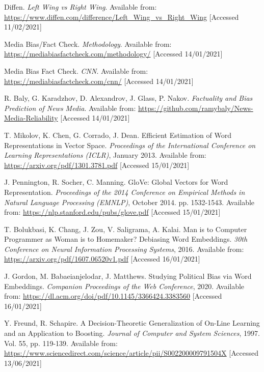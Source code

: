 \begin{thebibliography}{9}
Diffen. \textit{Left Wing vs Right Wing}. Available from: \url{https://www.diffen.com/difference/Left_Wing_vs_Right_Wing} [Accessed 11/02/2021]

Media Bias/Fact Check. \textit{Methodology}. Available from: \url{https://mediabiasfactcheck.com/methodology/} [Accessed 14/01/2021]

Media Bias Fact Check. \textit{CNN}. Available from: \url{https://mediabiasfactcheck.com/cnn/} [Accessed 14/01/2021]

R. Baly, G. Karadzhov, D. Alexandrov, J. Glass, P. Nakov. \textit{Factuality and Bias Prediction of News Media}. Available from: \url{https://github.com/ramybaly/News-Media-Reliability} [Accessed 14/01/2021]

T. Mikolov, K. Chen, G. Corrado, J. Dean. Efficient Estimation of Word Representations in Vector Space. \textit{Proceedings of the International Conference on Learning Representations (ICLR)}, January 2013. Available from: \url{https://arxiv.org/pdf/1301.3781.pdf} [Accessed 15/01/2021]

J. Pennington, R. Socher, C. Manning. GloVe: Global Vectors for Word Representation. \textit{Proceedings of the 2014 Conference on Empirical Methods in Natural Language Processing (EMNLP)}, October 2014. pp. 1532-1543. Available from: \url{https://nlp.stanford.edu/pubs/glove.pdf} [Accessed 15/01/2021]

T. Bolukbasi, K. Chang, J. Zou, V. Saligrama, A. Kalai. Man is to Computer Programmer as Woman is to
Homemaker? Debiasing Word Embeddings. \textit{30th Conference on Neural Information Processing Systems}, 2016. Available from: \url{https://arxiv.org/pdf/1607.06520v1.pdf} [Accessed 16/01/2021]

J. Gordon, M. Babaeianjelodar, J. Matthews. Studying Political Bias via Word Embeddings. \textit{Companion Proceedings of the Web Conference}, 2020. Available from: \url{https://dl.acm.org/doi/pdf/10.1145/3366424.3383560} [Accessed 16/01/2021]

Y. Freund, R. Schapire. A Decision-Theoretic Generalization of On-Line Learning and an Application to Boosting. \textit{Journal of Computer and System Sciences}, 1997. Vol. 55, pp. 119-139. Available from: \url{https://www.sciencedirect.com/science/article/pii/S002200009791504X} [Accessed 13/06/2021]


\end{thebibliography}

